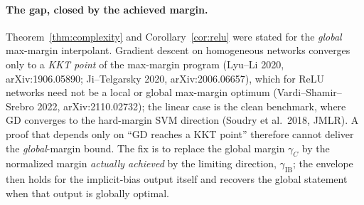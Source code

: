 \documentclass[11pt]{article}
\theoremstyle{definition}
\begin{document}
\paragraph{The gap, closed by the achieved margin.} Theorem~\ref{thm:complexity} and
Corollary~\ref{cor:relu} were stated for the \emph{global} max-margin interpolant.
Gradient descent on homogeneous networks converges only to a \emph{KKT point} of the
max-margin program (Lyu--Li 2020, arXiv:1906.05890; Ji--Telgarsky 2020,
arXiv:2006.06657), which for ReLU networks need not be a local or global max-margin
optimum (Vardi--Shamir--Srebro 2022, arXiv:2110.02732); the linear case is the clean
benchmark, where GD converges to the hard-margin SVM direction (Soudry et al.\ 2018,
JMLR). A proof that depends only on ``GD reaches a KKT point'' therefore cannot deliver
the \emph{global}-margin bound. The fix is to replace the global margin $\gamma_C$ by
the normalized margin \emph{actually achieved} by the limiting direction,
$\gamma_{\mathrm{IB}}$; the envelope then holds for the implicit-bias output itself and
recovers the global statement when that output is globally optimal.
\end{document}

